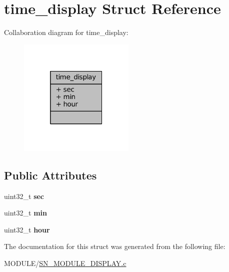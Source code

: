 \hypertarget{structtime__display}{}\section{time\+\_\+display Struct Reference}
\label{structtime__display}


Collaboration diagram for time\+\_\+display\+:\nopagebreak
\begin{figure}[H]
\begin{center}
\leavevmode
\includegraphics[width=157pt]{structtime__display__coll__graph}
\end{center}
\end{figure}
\subsection*{Public Attributes}
\begin{DoxyCompactItemize}
\item 
\mbox{\label{structtime__display_a30c125154c3a76e2be9064b6cd163cea}} 
uint32\+\_\+t {\bfseries sec}
\item 
\mbox{\label{structtime__display_a9ccb3cc988c11aadc57cbcd80428c22e}} 
uint32\+\_\+t {\bfseries min}
\item 
\mbox{\label{structtime__display_a6817e971f5536aeacb18fc01110713f9}} 
uint32\+\_\+t {\bfseries hour}
\end{DoxyCompactItemize}


The documentation for this struct was generated from the following file\+:\begin{DoxyCompactItemize}
\item 
M\+O\+D\+U\+L\+E/\hyperlink{SN__MODULE__DISPLAY_8c}{S\+N\+\_\+\+M\+O\+D\+U\+L\+E\+\_\+\+D\+I\+S\+P\+L\+A\+Y.\+c}\end{DoxyCompactItemize}
